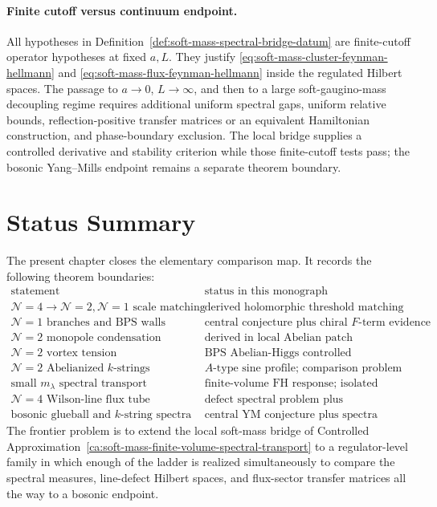 \paragraph{Finite cutoff versus continuum endpoint.}
All hypotheses in
Definition~\ref{def:soft-mass-spectral-bridge-datum} are finite-cutoff
operator hypotheses at fixed \(a,L\).  They justify
\eqref{eq:soft-mass-cluster-feynman-hellmann} and
\eqref{eq:soft-mass-flux-feynman-hellmann} inside the regulated Hilbert
spaces.  The passage to \(a\to0\), \(L\to\infty\), and then to a large
soft-gaugino-mass decoupling regime requires additional uniform spectral
gaps, uniform relative bounds, reflection-positive transfer matrices or an
equivalent Hamiltonian construction, and phase-boundary exclusion.  The local
bridge supplies a controlled derivative and stability criterion while those
finite-cutoff tests pass; the bosonic Yang--Mills endpoint remains a
separate theorem boundary.

\section{Status Summary}
\label{sec:susy-ym-family-status-summary}

The present chapter closes the elementary comparison map.  It records the
following theorem boundaries:
\[
\begin{array}{c|c}
\text{statement} & \text{status in this monograph}\\
\hline
\mathcal N=4\to\mathcal N=2,\mathcal N=1
\text{ scale matching} & \text{derived holomorphic threshold matching}\\
\mathcal N=1\text{ branches and BPS walls} &
  \text{central conjecture plus chiral }F\text{-term evidence}\\
\mathcal N=2\text{ monopole condensation} &
  \text{derived in local Abelian patch}\\
\mathcal N=2\text{ vortex tension} &
  \text{BPS Abelian-Higgs controlled approximation}\\
\mathcal N=2\text{ Abelianized }k\text{-strings} &
  \text{\(A\)-type sine profile; comparison problem}\\
\text{small }m_\lambda\text{ spectral transport} &
  \text{finite-volume FH response; isolated windows}\\
\mathcal N=4\text{ Wilson-line flux tube} &
  \text{defect spectral problem plus integrability hypotheses}\\
\text{bosonic glueball and }k\text{-string spectra} &
  \text{central YM conjecture plus spectra}
\end{array}
\]
The frontier problem is to extend the local soft-mass bridge of
Controlled Approximation~\ref{ca:soft-mass-finite-volume-spectral-transport}
to a regulator-level
family in which enough of the ladder is realized simultaneously to compare the
spectral measures, line-defect Hilbert spaces, and flux-sector transfer
matrices all the way to a bosonic endpoint.

